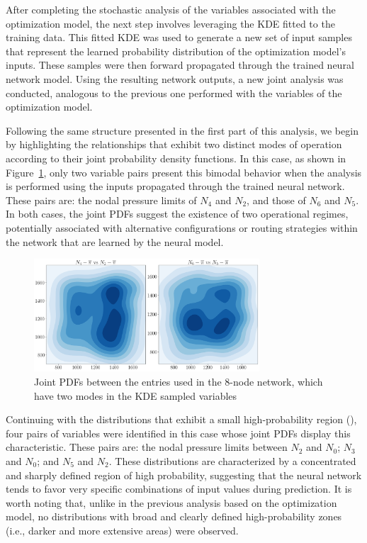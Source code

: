 After completing the stochastic analysis of the variables associated with the optimization model, the next step involves leveraging the KDE fitted to the training data. This fitted KDE was used to generate a new set of input samples that represent the learned probability distribution of the optimization model's inputs. These samples were then forward propagated through the trained neural network model. Using the resulting network outputs, a new joint analysis was conducted, analogous to the previous one performed with the variables of the optimization model. 

Following the same structure presented in the first part of this analysis, we begin by highlighting the relationships that exhibit two distinct modes of operation according to their joint probability density functions. In this case, as shown in Figure~\cref{fig:joint_distributions_input_input_KDE}, only two variable pairs present this bimodal behavior when the analysis is performed using the inputs propagated through the trained neural network. These pairs are: the nodal pressure limits of $N_4$ and $N_2$, and those of $N_6$ and $N_5$. In both cases, the joint PDFs suggest the existence of two operational regimes, potentially associated with alternative configurations or routing strategies within the network that are learned by the neural model. 


\begin{figure}[htbp]
    \begin{center}
        \includegraphics[width=0.75\textwidth]{figures/Chapter_NonLinealCensnet/PDF_inputs_inputs (Sampled).png}
    \end{center}
    \caption{Joint PDFs between the entries used in the 8-node network, which have two modes in the KDE sampled variables}
    \label{fig:joint_distributions_input_input_KDE}
\end{figure}
     

Continuing with the distributions that exhibit a small high-probability region (), four pairs of variables were identified in this case whose joint PDFs display this characteristic. These pairs are: the nodal pressure limits between $N_2$ and $N_0$; $N_3$ and $N_0$; and $N_5$ and $N_2$. These distributions are characterized by a concentrated and sharply defined region of high probability, suggesting that the neural network tends to favor very specific combinations of input values during prediction. It is worth noting that, unlike in the previous analysis based on the optimization model, no distributions with broad and clearly defined high-probability zones (i.e., darker and more extensive areas) were observed.


